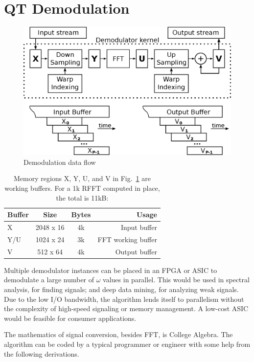 \section{QT Demodulation}

\begin{figure}
	\centering
	\includegraphics[width=0.95\linewidth]{../source/demod_e}
	\caption[Quantum to Relative Time Demodulation]{Demodulation data flow}
	\label{fig:demod}
\end{figure}

\begin{table}
	\label{tab:memory}
	\caption{Memory regions X, Y, U, and V in Fig.~\ref{fig:demod}
	are working buffers. For a 1k RFFT computed in place, the total is 11kB:}
	\centering
	\begin{tabular}{lccr}
		\hline\hline
		Buffer & Size & Bytes & Usage \\ [0.5ex]
		\hline
		X & 2048 x 16 & 4k & Input buffer\\
		Y/U & 1024 x 24 & 3k & FFT working buffer\\
		V & 512 x 64 & 4k & Output buffer\\
		\hline
	\end{tabular}
\end{table}

Multiple demodulator instances can be placed in an FPGA or ASIC to demodulate a
large number of $\omega$ values in parallel. This would be used in spectral
analysis, for finding signals; and deep data mining, for analyzing weak signals.
Due to the low I/O bandwidth, the algorithm lends itself to parallelism without
the complexity of high-speed signaling or memory management.
A low-cost ASIC would be feasible for consumer applications.

The mathematics of signal conversion, besides FFT, is College Algebra.
The algorithm can be coded by a typical programmer or engineer with some help
from the following derivations.

